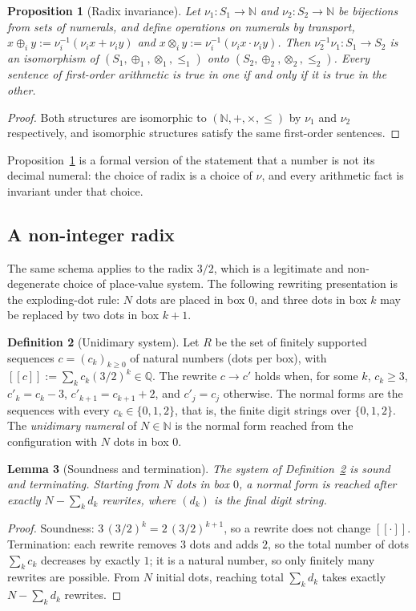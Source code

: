 \documentclass[11pt]{article}
\newcommand{\sem}[1]{[\![#1]\!]}
\theoremstyle{definition}
\newtheorem{definition}{Definition}[section]
\theoremstyle{plain}
\newtheorem{proposition}[definition]{Proposition}
\newtheorem{lemma}[definition]{Lemma}
\theoremstyle{remark}
\begin{document}
\begin{proposition}[Radix invariance]\label{prop:radixinv}
Let $\nu_1:S_1\to\mathbb{N}$ and $\nu_2:S_2\to\mathbb{N}$ be bijections from sets of numerals, and define operations on numerals by transport, $x\oplus_i y:=\nu_i^{-1}(\nu_i x+\nu_i y)$ and $x\otimes_i y:=\nu_i^{-1}(\nu_i x\cdot\nu_i y)$. Then $\nu_2^{-1}\nu_1:S_1\to S_2$ is an isomorphism of $(S_1,\oplus_1,\otimes_1,\le_1)$ onto $(S_2,\oplus_2,\otimes_2,\le_2)$. Every sentence of first-order arithmetic is true in one if and only if it is true in the other.
\end{proposition}
\begin{proof}
Both structures are isomorphic to $(\mathbb{N},+,\times,\le)$ by $\nu_1$ and $\nu_2$ respectively, and isomorphic structures satisfy the same first-order sentences.
\end{proof}

Proposition~\ref{prop:radixinv} is a formal version of the statement that a number is not its decimal numeral: the choice of radix is a choice of $\nu$, and every arithmetic fact is invariant under that choice.

\subsection{A non-integer radix}

The same schema applies to the radix $3/2$, which is a legitimate and non-degenerate choice of place-value system. The following rewriting presentation is the exploding-dot rule: $N$ dots are placed in box $0$, and three dots in box $k$ may be replaced by two dots in box $k+1$.

\begin{definition}[Unidimary system]\label{def:unid}
Let $R$ be the set of finitely supported sequences $c=(c_k)_{k\ge0}$ of natural numbers (dots per box), with $\sem c:=\sum_kc_k(3/2)^k\in\mathbb{Q}$. The rewrite $c\to c'$ holds when, for some $k$, $c_k\ge3$, $c'_k=c_k-3$, $c'_{k+1}=c_{k+1}+2$, and $c'_j=c_j$ otherwise. The normal forms are the sequences with every $c_k\in\{0,1,2\}$, that is, the finite digit strings over $\{0,1,2\}$. The \emph{unidimary numeral} of $N\in\mathbb{N}$ is the normal form reached from the configuration with $N$ dots in box $0$.
\end{definition}

\begin{lemma}[Soundness and termination]\label{lem:unid-st}
The system of Definition~\ref{def:unid} is sound and terminating. Starting from $N$ dots in box $0$, a normal form is reached after exactly $N-\sum_kd_k$ rewrites, where $(d_k)$ is the final digit string.
\end{lemma}
\begin{proof}
Soundness: $3\,(3/2)^k=2\,(3/2)^{k+1}$, so a rewrite does not change $\sem{\cdot}$. Termination: each rewrite removes $3$ dots and adds $2$, so the total number of dots $\sum_kc_k$ decreases by exactly $1$; it is a natural number, so only finitely many rewrites are possible. From $N$ initial dots, reaching total $\sum_kd_k$ takes exactly $N-\sum_kd_k$ rewrites.
\end{proof}
\end{document}
